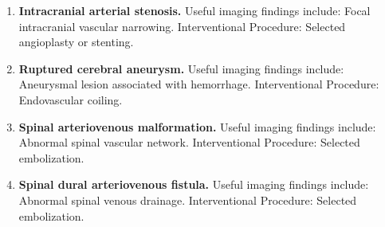 \begin{enumerate}[leftmargin=*,itemsep=0.45em,topsep=0.4em]
\item \textbf{Intracranial arterial stenosis.} Useful imaging findings include: Focal intracranial vascular narrowing. Interventional Procedure: Selected angioplasty or stenting.
\item \textbf{Ruptured cerebral aneurysm.} Useful imaging findings include: Aneurysmal lesion associated with hemorrhage. Interventional Procedure: Endovascular coiling.
\item \textbf{Spinal arteriovenous malformation.} Useful imaging findings include: Abnormal spinal vascular network. Interventional Procedure: Selected embolization.
\item \textbf{Spinal dural arteriovenous fistula.} Useful imaging findings include: Abnormal spinal venous drainage. Interventional Procedure: Selected embolization.
\end{enumerate}

